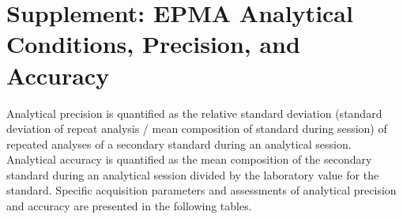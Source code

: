 \documentclass[draft]{agujournal2019}
\begin{document}






\appendix
\section{Supplement: EPMA Analytical Conditions, Precision, and Accuracy}

\label{supplement:a}
Analytical precision is quantified as the relative standard deviation (standard deviation of repeat analysis / mean composition of standard during session) of repeated analyses of a secondary standard during an analytical session. Analytical accuracy is quantified as the mean composition of the secondary standard during an analytical session divided by the laboratory value for the standard. Specific acquisition parameters and assessments of analytical precision and accuracy are presented in the following tables. 
\end{document}
